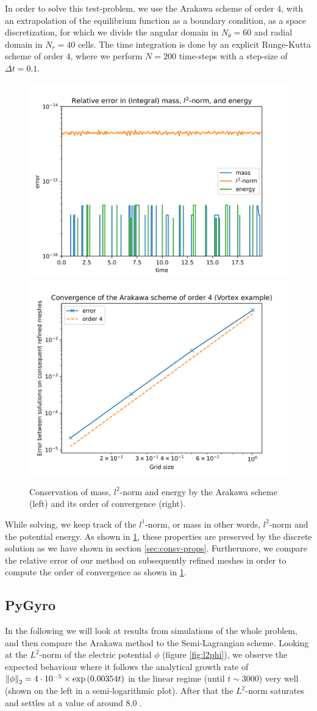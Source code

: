 In order to solve this test-problem, we use the Arakawa scheme of order $4$, with an extrapolation of the equilibrium function as a boundary condition, as a space discretization, for which we divide the angular domain in $N_\theta = 60$ and radial domain in $N_r = 40$ cells. The time integration is done by an explicit Runge-Kutta scheme of order $4$, where we perform $N = 200$ time-steps with a step-size of $\Delta t = 0.1$.
\begin{figure}[h]
	\centering
	\includegraphics[width=0.45\linewidth]{plots/vortex_cons.png}
	\includegraphics[width=0.45\linewidth]{plots/vortex_conv.png}
	\caption{Conservation of mass, $l^2$-norm and energy by the Arakawa scheme (left) and its order of convergence (right).}
	\label{fig:vortex_con}
\end{figure}
While solving, we keep track of the $l^1$-norm, or mass in other words, $l^2$-norm and the potential energy. As shown in \ref{fig:vortex_con}, these properties are preserved by the discrete solution as we have shown in section \ref{sec:consv-props}. Furthermore, we compare the relative error of our method on subsequently refined meshes in order to compute the order of convergence as shown in \ref{fig:vortex_con}.





\subsection{PyGyro}

In the following we will look at results from simulations of the whole problem, and then compare the Arakawa method to the Semi-Lagrangian scheme. Looking at the $L^2$-norm of the electric potential $\phi$ (figure \ref{fig:l2phi}), we observe the expected behaviour where it follows the analytical growth rate of $\norm{\phi}_2 = 4\cdot 10^{-5} \times \exp\left(0.00354 t\right)$ in the linear regime (until $t \sim 3000$) very well (shown on the left in a semi-logarithmic plot). After that the $L^2$-norm saturates and settles at a value of around $8.0$ .

